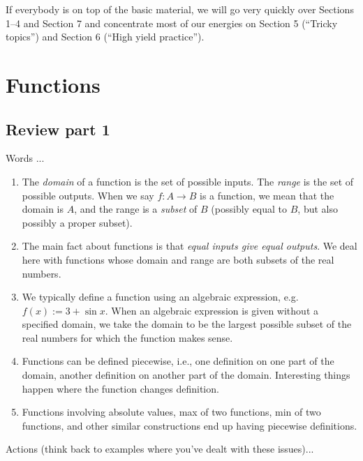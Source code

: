 \documentclass[10pt]{amsart}
\begin{document}
If everybody is on top of the basic material, we will go very quickly
over Sections 1--4 and Section 7 and concentrate most of our energies
on Section 5 (``Tricky topics'') and Section 6 (``High yield
practice'').

\section{Functions}

\subsection{Review part 1}

Words ...

\begin{enumerate}

\item The {\em domain} of a function is the set of possible
  inputs. The {\em range} is the set of possible outputs. When we say
  $f:A \to B$ is a function, we mean that the domain is $A$, and the
  range is a {\em subset} of $B$ (possibly equal to $B$, but also
  possibly a proper subset).
\item The main fact about functions is that {\em equal inputs give
  equal outputs}. We deal here with functions whose domain and range
  are both subsets of the real numbers.
\item We typically define a function using an algebraic expression,
  e.g. $f(x) := 3 + \sin x$. When an algebraic expression is given
  without a specified domain, we take the domain to be the largest
  possible subset of the real numbers for which the function makes
  sense.
\item Functions can be defined piecewise, i.e., one definition on one
  part of the domain, another definition on another part of the
  domain. Interesting things happen where the function changes
  definition.
\item Functions involving absolute values, max of two functions, min
  of two functions, and other similar constructions end up having
  piecewise definitions.
\end{enumerate}

Actions (think back to examples where you've dealt with these issues)...
\end{document}
